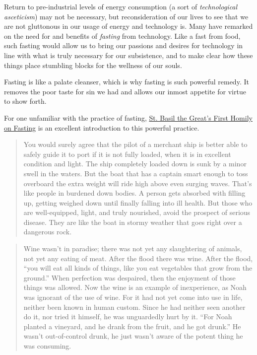 \documentclass[letterpaper]{article}
\begin{document}
Return to pre-industrial levels of energy consumption (a sort of \textit{technological asceticism}) may not be necessary, but reconsideration of our lives to see that we are not gluttonous in our usage of energy and technology is. Many have remarked on the need for and benefits of \textit{fasting} from technology. Like a fast from food, such fasting would allow us to bring our passions and desires for technology in line with what is truly necessary for our subsistence, and to make clear how these things place stumbling blocks for the wellness of our souls. 

Fasting is like a palate cleanser, which is why fasting is such powerful remedy. It removes the poor taste for sin we had and allows our inmost appetite for virtue to show forth.

For one unfamiliar with the practice of fasting, \href{http://rutgersnb.occministries.org/wp-content/uploads/2015/07/St.-Basil-the-Great%E2%80%99s-First-Homily-on-Fasting.pdf}{St. Basil the Great's First Homily on Fasting} is an excellent introduction to this powerful practice. 

\begin{quote}
  You would surely agree that the pilot of a merchant ship is better able to safely guide it to port if it is not fully loaded, when it is in excellent condition and light. The ship completely loaded down is sunk by a minor swell in the waters. But the boat that has a captain smart enough to toss overboard the extra weight will ride high above even surging waves.
  That’s like people in burdened down bodies. A person gets absorbed with filling up, getting weighed down until finally falling into ill health. But those who are well-equipped, light, and truly nourished, avoid the prospect of serious disease. They are like the boat in stormy weather that goes right over a dangerous rock.
\end{quote}

\iffalse
\begin{quote}
  Wine wasn’t in paradise; there was not yet any slaughtering of animals, not yet any eating of meat. After the flood there was wine. After the flood, “you will eat all kinds of things, like you eat vegetables that grow from the ground.” When perfection was despaired, then the enjoyment of those things was allowed.
  Now the wine is an example of inexperience, as Noah was ignorant of the use of wine. For it had not yet come into use in life, neither been known in human custom. Since he had neither seen another do it, nor tried it himself, he was unguardedly hurt by it. “For Noah planted a vineyard, and he drank from the fruit, and he got drunk.” He wasn’t out-of-control drunk, he just wasn’t aware of the potent thing he was consuming.
\end{quote}
\end{document}
